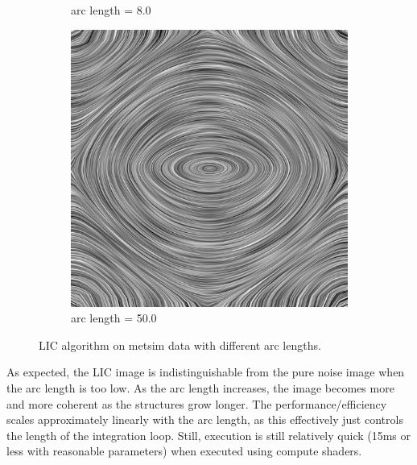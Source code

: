 \documentclass{article}
\begin{document}
\begin{figure}[h!]
\begin{subfigure}{0.30\textwidth}
        \caption{arc length = 8.0}
    \end{subfigure}
    \hfill
    \begin{subfigure}{0.30\textwidth}
        \centering
        \includegraphics[width=\textwidth]{lic_metsim_arc_50.png}
        \caption{arc length = 50.0}
    \end{subfigure}
    \caption{LIC algorithm on metsim data with different arc lengths.}
\end{figure}

As expected, the LIC image is indistinguishable from the pure noise image when the arc length is too low.
As the arc length increases, the image becomes more and more coherent as the structures grow longer. The performance/efficiency scales approximately 
linearly with the arc length, as this effectively just controls the length of the integration loop. Still, execution is still 
relatively quick (15ms or less with reasonable parameters) when executed using compute shaders.
\end{document}
